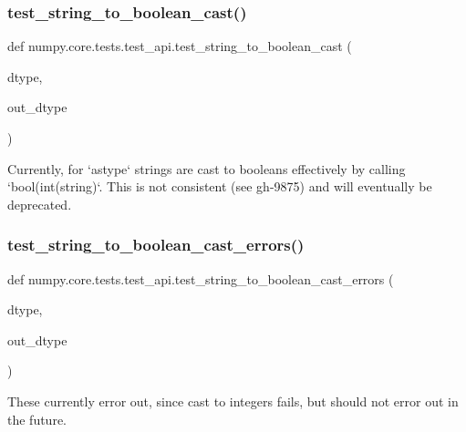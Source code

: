 \subsubsection{\texorpdfstring{test\+\_\+string\+\_\+to\+\_\+boolean\+\_\+cast()}{test\_string\_to\_boolean\_cast()}}
{\footnotesize\ttfamily def numpy.\+core.\+tests.\+test\+\_\+api.\+test\+\_\+string\+\_\+to\+\_\+boolean\+\_\+cast (\begin{DoxyParamCaption}\item[{}]{dtype,  }\item[{}]{out\+\_\+dtype }\end{DoxyParamCaption})}

\begin{DoxyVerb}Currently, for `astype` strings are cast to booleans effectively by
calling `bool(int(string)`. This is not consistent (see gh-9875) and
will eventually be deprecated.
\end{DoxyVerb}
 \mbox{\label{namespacenumpy_1_1core_1_1tests_1_1test__api_a6fd9d1e3af28cae8344a5fb74caf60ba}} 
\subsubsection{\texorpdfstring{test\+\_\+string\+\_\+to\+\_\+boolean\+\_\+cast\+\_\+errors()}{test\_string\_to\_boolean\_cast\_errors()}}
{\footnotesize\ttfamily def numpy.\+core.\+tests.\+test\+\_\+api.\+test\+\_\+string\+\_\+to\+\_\+boolean\+\_\+cast\+\_\+errors (\begin{DoxyParamCaption}\item[{}]{dtype,  }\item[{}]{out\+\_\+dtype }\end{DoxyParamCaption})}

\begin{DoxyVerb}These currently error out, since cast to integers fails, but should not
error out in the future.
\end{DoxyVerb}
 \mbox{\label{namespacenumpy_1_1core_1_1tests_1_1test__api_ad834d42b9c791b4bc5f5deeff5089e8e}} 
